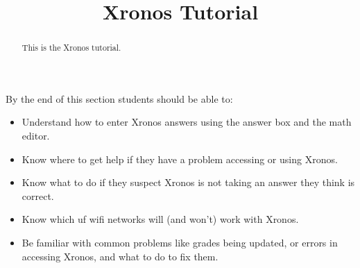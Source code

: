 \documentclass{ximeraXloud}
\title{Xronos Tutorial}
\begin{document}
\begin{abstract}
This is the Xronos tutorial.
\end{abstract}
\maketitle
By the end of this section students should be able to:

\begin{itemize}
\item Understand how to enter Xronos answers using the answer box and the math editor.
\item Know where to get help if they have a problem accessing or using Xronos.
\item Know what to do if they suspect Xronos is not taking an answer they think is correct.
\item Know which uf wifi networks will (and won't) work with Xronos.
\item Be familiar with common problems like grades being updated, or errors in accessing Xronos, and what to do to fix them.
\end{itemize}
\end{document}
